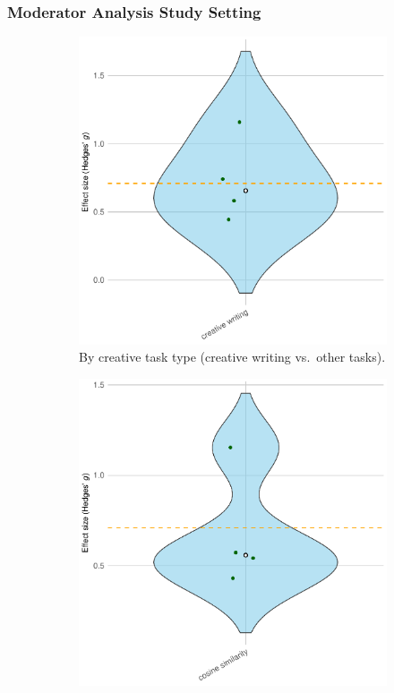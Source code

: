 \documentclass[manuscript, screen, review, acmsmall, anonymous]{acmart}
\begin{document}
\subsubsection{Moderator Analysis Study Setting}
\label{sec:CreativeDiversity_Moderator_Study_Setting}
\begin{figure}[H]
  \centering
  \begin{subfigure}[t]{0.49\linewidth}
    \centering
    \includegraphics[width=\linewidth]{plot_diversity_raw_violin_Task_Type}
    \caption{By creative task type (creative writing vs.\ other tasks).}
    \label{fig:diversity_raw_violin_task_type}
  \end{subfigure}%
  \hfill
  \begin{subfigure}[t]{0.49\linewidth}
    \centering
    \includegraphics[width=\linewidth]{plot_diversity_raw_violin_Creativity_Measurement}

\end{subfigure}
\end{figure}
\end{document}
